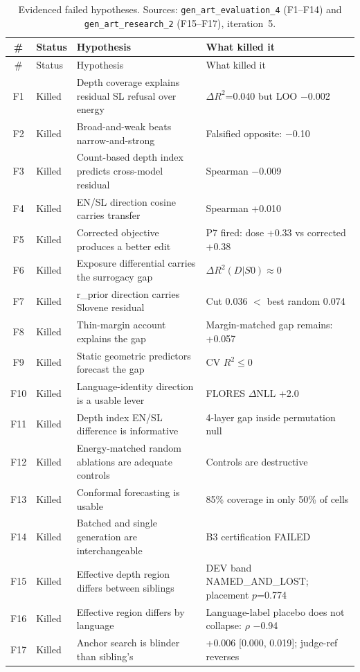 \documentclass[11pt,letterpaper]{article}
\begin{document}
\begin{longtable}{clp{6cm}p{5cm}}
\caption{Evidenced failed hypotheses. Sources: \texttt{gen\_art\_evaluation\_4} (F1--F14) and \texttt{gen\_art\_research\_2} (F15--F17), iteration~5.} \label{tab:dead_ends} \\
\toprule
\# & Status & Hypothesis & What killed it \\
\midrule
\endfirsthead
\toprule
\# & Status & Hypothesis & What killed it \\
\midrule
\endhead
F1 & Killed & Depth coverage explains residual SL refusal over energy & $\Delta R^2$=0.040 but LOO $-$0.002 \\
F2 & Killed & Broad-and-weak beats narrow-and-strong & Falsified opposite: $-$0.10 \\
F3 & Killed & Count-based depth index predicts cross-model residual & Spearman $-$0.009 \\
F4 & Killed & EN/SL direction cosine carries transfer & Spearman +0.010 \\
F5 & Killed & Corrected objective produces a better edit & P7 fired: dose +0.33 vs corrected +0.38 \\
F6 & Killed & Exposure differential carries the surrogacy gap & $\Delta R^2(D|S0) \approx 0$ \\
F7 & Killed & r\_prior direction carries Slovene residual & Cut 0.036 $<$ best random 0.074 \\
F8 & Killed & Thin-margin account explains the gap & Margin-matched gap remains: +0.057 \\
F9 & Killed & Static geometric predictors forecast the gap & CV $R^2 \leq 0$ \\
F10 & Killed & Language-identity direction is a usable lever & FLORES $\Delta$NLL +2.0 \\
F11 & Killed & Depth index EN/SL difference is informative & 4-layer gap inside permutation null \\
F12 & Killed & Energy-matched random ablations are adequate controls & Controls are destructive \\
F13 & Killed & Conformal forecasting is usable & 85\% coverage in only 50\% of cells \\
F14 & Killed & Batched and single generation are interchangeable & B3 certification FAILED \\
F15 & Killed & Effective depth region differs between siblings & DEV band NAMED\_AND\_LOST; placement $p$=0.774 \\
F16 & Killed & Effective region differs by language & Language-label placebo does not collapse: $\rho$ $-$0.94 \\
F17 & Killed & Anchor search is blinder than sibling's & +0.006 [0.000, 0.019]; judge-ref reverses \\
\bottomrule
\end{longtable}
\end{document}
